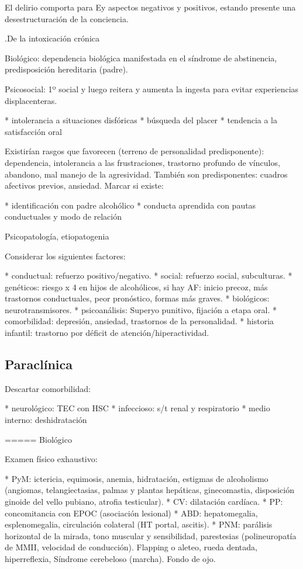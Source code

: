 \documentclass{scrbook}
\begin{document}
El delirio comporta para Ey aspectos negativos y positivos, estando presente una desestructuración de la conciencia.

.De la intoxicación crónica

Biológico: dependencia biológica manifestada en el síndrome de abstinencia, predisposición hereditaria (padre).

Psicosocial: 1º social y luego reitera y aumenta la ingesta para evitar experiencias displacenteras.

* intolerancia a situaciones disfóricas
* búsqueda del placer
* tendencia a la satisfacción oral

Existirían rasgos que favorecen (terreno de personalidad predisponente): dependencia, intolerancia a las frustraciones, trastorno profundo de vínculos, abandono, mal manejo de la agresividad. También son predisponentes: cuadros afectivos previos, ansiedad. Marcar si existe:

* identificación con padre alcohólico
* conducta aprendida con pautas conductuales y modo de relación

Psicopatología, etiopatogenia

Considerar los siguientes factores:

* conductual: refuerzo positivo/negativo.
* social: refuerzo social, subculturas.
* genéticos: riesgo x 4 en hijos de alcohólicos, si hay AF: inicio precoz, más trastornos conductuales, peor pronóstico, formas más graves.
* biológicos: neurotransmisores.
* psicoanálisis: Superyo punitivo, fijación a etapa oral.
* comorbilidad: depresión, ansiedad, trastornos de la personalidad.
* historia infantil: trastorno por déficit de atención/hiperactividad.

\subsection*{Paraclínica}

Descartar comorbilidad:

* neurológico: TEC con HSC
* infeccioso: s/t renal y respiratorio
* medio interno: deshidratación

===== Biológico

Examen físico exhaustivo:

* PyM: ictericia, equimosis, anemia, hidratación, estigmas de alcoholismo (angiomas, telangiectasias, palmas y plantas hepáticas, ginecomastia, disposición ginoide del vello pubiano, atrofia testicular).
* CV: dilatación cardíaca.
* PP: concomitancia con EPOC (asociación lesional)
* ABD: hepatomegalia, esplenomegalia, circulación colateral (HT portal, ascitis).
* PNM: parálisis horizontal de la mirada, tono muscular y sensibilidad, parestesias (polineuropatía de MMII, velocidad de conducción). Flapping o aleteo, rueda dentada, hiperreflexia, Síndrome cerebeloso (marcha). Fondo de ojo.
\end{document}
